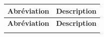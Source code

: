
\begin{center}
    \begin{longtable}{|p{3.5cm}|p{11.5cm}|}
        
        \hline
        
        \textbf{Abréviation} & \textbf{Description} \\
        
        \hline
        \endfirsthead %
        
        \hline
        \textbf{Abréviation} & \textbf{Description} \\
        \hline
        \endhead
        
        \hline
        \endfoot
        
        \hline
        \endlastfoot
    

\end{longtable}
\end{center}
